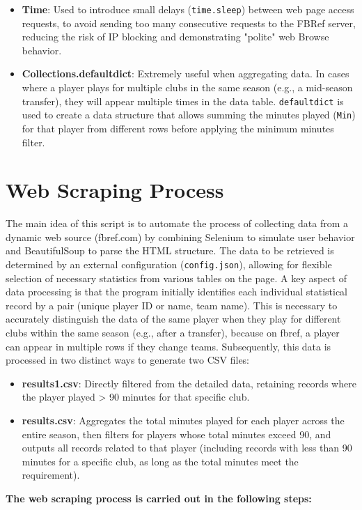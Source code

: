 \documentclass[12pt, a4paper]{report}
\begin{document}
\begin{itemize}
    \item \textbf{Time}: Used to introduce small delays (\texttt{time.sleep}) between web page access requests, to avoid sending too many consecutive requests to the FBRef server, reducing the risk of IP blocking and demonstrating "polite" web Browse behavior.
    \item \textbf{Collections.defaultdict}: Extremely useful when aggregating data. In cases where a player plays for multiple clubs in the same season (e.g., a mid-season transfer), they will appear multiple times in the data table. \texttt{defaultdict} is used to create a data structure that allows summing the minutes played (\texttt{Min}) for that player from different rows before applying the minimum minutes filter.
\end{itemize}

\section{Web Scraping Process}
The main idea of this script is to automate the process of collecting data from a dynamic web source (fbref.com) by combining Selenium to simulate user behavior and BeautifulSoup to parse the HTML structure. The data to be retrieved is determined by an external configuration (\texttt{config.json}), allowing for flexible selection of necessary statistics from various tables on the page.
A key aspect of data processing is that the program initially identifies each individual statistical record by a pair (unique player ID or name, team name). This is necessary to accurately distinguish the data of the same player when they play for different clubs within the same season (e.g., after a transfer), because on fbref, a player can appear in multiple rows if they change teams.
Subsequently, this data is processed in two distinct ways to generate two CSV files:
\begin{itemize}
    \item \textbf{results1.csv}: Directly filtered from the detailed data, retaining records where the player played > 90 minutes for that specific club.
    \item \textbf{results.csv}: Aggregates the total minutes played for each player across the entire season, then filters for players whose total minutes exceed 90, and outputs all records related to that player (including records with less than 90 minutes for a specific club, as long as the total minutes meet the requirement).
\end{itemize}
\textbf{The web scraping process is carried out in the following steps:}
\end{document}
